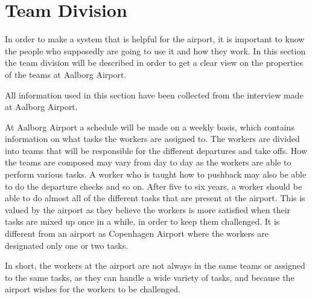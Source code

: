 \section{Team Division}
In order to make a system that is helpful for the airport, it is important to know the people who supposedly are going to use it and how they work. In this section the team division will be described in order to get a clear view on the properties of the teams at Aalborg Airport.

All information used in this section have been collected from the interview made at Aalborg Airport.



At Aalborg Airport a schedule will be made on a weekly basis, which contains information on what tasks the workers are assigned to. The workers are divided into teams that will be responsible for the different departures and take offs. How the teams are composed may vary from day to day as the workers are able to perform various tasks. A worker who is taught how to pushback may also be able to do the departure checks and so on. After five to six years, a worker should be able to do almost all of the different tasks that are present at the airport. This is valued by the airport as they believe the workers is more satisfied when their tasks are mixed up once in a while, in order to keep them challenged. It is different from an airport as Copenhagen Airport where the workers are designated only one or two tasks.  


In short, the workers at the airport are not always in the same teams or assigned to the same tasks, as they can handle a wide variety of tasks, and because the airport wishes for the workers to be challenged.